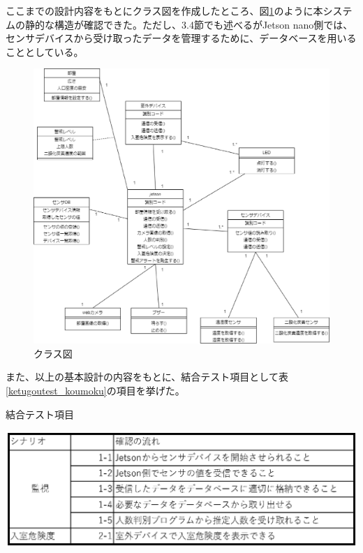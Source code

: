 ここまでの設計内容をもとにクラス図を作成したところ、図\ref{class}のように本システムの静的な構造が確認できた。ただし、3.4節でも述べるがJetson nano側では、センサデバイスから受け取ったデータを管理するために、データベースを用いることとしている。

\begin{figure}[H]
	\centering
	\includegraphics[width=12cm]{class.eps}
	\caption{クラス図}
	\label{class}
\end{figure}


また、以上の基本設計の内容をもとに、結合テスト項目として表\ref{ketugoutest_koumoku}の項目を挙げた。


\begin{table}[H]
	\centering
	\caption{結合テスト項目}
	\includegraphics[width=15cm]{ketugoutest_koumoku.eps}
	\label{ketugoutest_koumoku}
\end{table}



